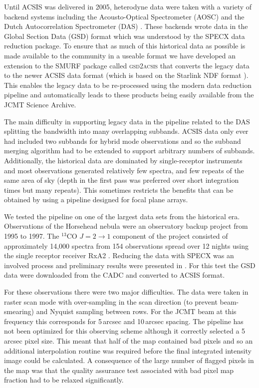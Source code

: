 \documentclass[final,authoryear,5p,times,twocolumn]{elsarticle}
\begin{document}
Until ACSIS was delivered in 2005, heterodyne data were taken with a
variety of backend systems including the Acousto-Optical Spectrometer
(AOSC) and the Dutch Autocorrelation Spectrometer (DAS)
\citep{1986SPIE..598..134B}. These backends wrote data in the
Global Section Data (GSD) format \citep[e.g.][]{GSD1999} which was
understood by the SPECX data reduction package. To ensure that as much
of this historical data as possible is made available to the community
in a useable format we have developed an extension to the SMURF
package called \textsc{gsd2acsis} that converts the legacy data to the
newer ACSIS data format (which is based on the Starlink NDF format
\citep{NDF,1988STARB...2...11C,P91_adassxxiii}). This enables the legacy data to be re-processed using
the modern data reduction pipeline and automatically leads to these
products being easily available from the JCMT Science Archive.

The main difficulty in supporting legacy data in the pipeline related
to the DAS splitting the bandwidth into many overlapping
subbands. ACSIS data only ever had included two subbands for hybrid
mode observations and so the subband merging algorithm had to be
extended to support arbitrary numbers of subbands. Additionally, the
historical data are dominated by single-receptor instruments and most
observations generated relatively few spectra, and few repeats of the
same area of sky (depth in the first pass was preferred over short
integration times but many repeats). This sometimes
restricts the benefits that can be obtained by using a pipeline
designed for focal plane arrays.

We tested the pipeline on one of the largest data sets from the
historical era. Observations of the Horsehead nebula were an
observatory backup project from 1995 to 1997. The $^{13}$CO
$J=2\rightarrow 1$ component of the project consisted of approximately
14,000 spectra from 154 observations spread over 12 nights using the
single receptor receiver RxA2 \citep{1992IJIMW..13..647D}. Reducing
the data with SPECX was an involved process and preliminary results
were presented in \citet{2001AAS...19915601S}. For this test the GSD data were
downloaded from the CADC and converted to ACSIS format.

For these observations there were two major difficulties. The data
were taken in raster scan mode with over-sampling in the scan
direction (to prevent beam-smearing) and Nyquist sampling between
rows. For the JCMT beam at this frequency this corresponds for
5\,arcsec and 10\,arcsec spacing. The pipeline has not been optimized
for this observing scheme although it correctly selected a 5\,arcsec
pixel size. This meant that half of the map contained bad pixels and
so an additional interpolation routine was required before the final
integrated intensity image could be calculated. A consequence of the
large number of flagged pixels in the map was that the quality
assurance test associated with bad pixel map fraction had to be
relaxed significantly.
\end{document}
